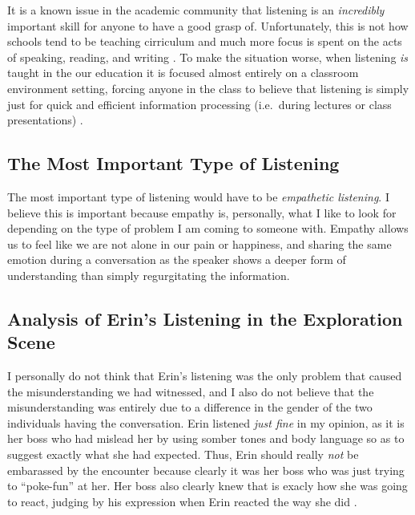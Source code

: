 \documentclass[stu,12pt]{apa7}
\begin{document}
      It is a known issue in the academic community that listening is an
        \textit{incredibly} important skill for anyone to have a good grasp of.
        Unfortunately, this is not how schools tend to be teaching cirriculum
        and much more focus is spent on the acts of speaking, reading, and
        writing \parencite[pp. 3]{bodie_listening_2012}. To make the situation
        worse, when listening \textit{is} taught in the our education it is
        focused almost entirely on a classroom environment setting, forcing
        anyone in the class to believe that listening is simply just for
        quick and efficient information processing (i.e.\ during lectures or
        class presentations) \parencite{bostrom_rethinking_2011}.

    \subsection{The Most Important Type of Listening}
      The most important type of listening would have to be
        \textit{empathetic listening}. I believe this is important because
        empathy is, personally, what I like to look for depending on the type
        of problem I am coming to someone with. Empathy allows us to feel like
        we are not alone in our pain or happiness, and sharing the same emotion
        during a conversation as the speaker shows a deeper form of
        understanding than simply regurgitating the information.

    \subsection{Analysis of Erin's Listening in the Exploration Scene}
      I personally do not think that Erin's listening was the only problem
        that caused the misunderstanding we had witnessed, and I also do not
        believe that the misunderstanding was entirely due to a difference in
        the gender of the two individuals having the conversation. Erin listened
        \textit{just fine} in my opinion, as it is her boss who had mislead her
        by using somber tones and body language so as to suggest exactly what
        she had expected. Thus, Erin should really \emph{not} be embarassed
        by the encounter because clearly it was her boss who was just trying to
        ``poke-fun'' at her. Her boss also clearly knew that is exacly how she
        was going to react, judging by his expression when Erin reacted the way
        she did \parencite{soderbergh_erin_2000}.
\end{document}
